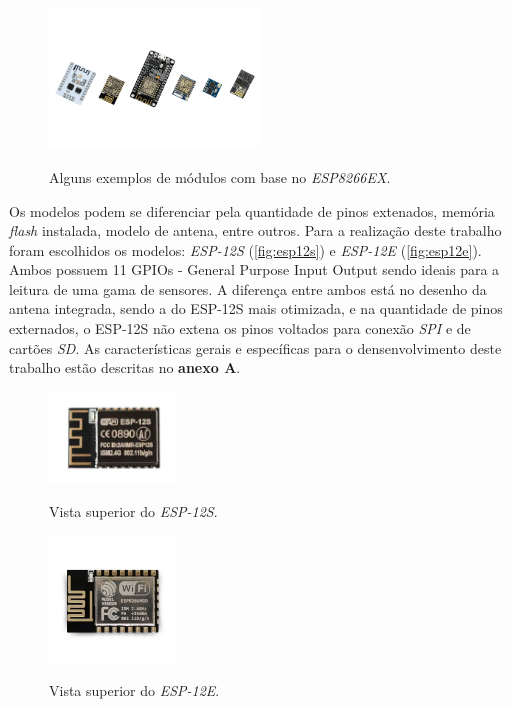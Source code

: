 \begin{figure}[H]
	\centering
	\caption{Alguns exemplos de módulos com base no \textit{ESP8266EX}.}
	\includegraphics[width=0.5\textwidth]{figuras/modulos_esp8266.png}
	\label{fig:modulos_esp8266}
\end{figure} 

Os modelos podem se diferenciar pela quantidade de pinos extenados, memória \textit{flash} instalada, modelo de antena, entre outros. Para a realização deste trabalho foram escolhidos os modelos: \textit{ESP-12S} (\autoref{fig:esp12s}) e \textit{ESP-12E} (\autoref{fig:esp12e}). Ambos possuem 11 {GPIOs - General Purpose Input Output} sendo ideais para a leitura de uma gama de sensores. A diferença entre ambos está no desenho da antena integrada, sendo a do ESP-12S mais otimizada, e na quantidade de pinos externados, o ESP-12S não extena os pinos voltados para conexão \textit{SPI} e de cartões \textit{SD}. As características gerais e específicas para o densenvolvimento deste trabalho estão descritas no \textbf{anexo A}. 


\begin{figure}[H]
	\centering
	\caption{Vista superior do \textit{ESP-12S}.}
	\includegraphics[width=0.3\textwidth]{figuras/ESP-12S.png}
	\label{fig:esp12s}
\end{figure} 

\begin{figure}[H]
	\centering
	\caption{Vista superior do \textit{ESP-12E}.}
	\includegraphics[width=0.3\textwidth]{figuras/ESP-12E.png}
	\label{fig:esp12e}
\end{figure} 



